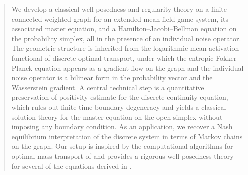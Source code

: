 \documentclass[10pt]{article}
\numberwithin{equation}{section}
\begin{document}
\begin{abstract} We develop a classical well-posedness and regularity theory on a finite connected weighted graph for an extended mean field game system, its associated master equation, and a Hamilton--Jacobi--Bellman equation on the probability simplex, all in the presence of an individual noise operator. The geometric structure is inherited from the logarithmic-mean activation functional of discrete optimal transport, under which the entropic Fokker--Planck equation appears as a gradient flow on the graph and the individual noise operator is a bilinear form in the probability vector and the Wasserstein gradient. A central technical step is a quantitative preservation-of-positivity estimate for the discrete continuity equation, which rules out finite-time boundary degeneracy and yields a classical solution theory for the master equation on the open simplex without imposing any boundary condition. As an application, we recover a Nash equilibrium interpretation of the discrete system in terms of Markov chains on the graph. Our setup is inspired by the computational algorithms for optimal mass transport of \cite{chow2012,li_2017} and provides a rigorous well-posedness theory for several of the equations derived in \cite{GaoLiLiu}.
\end{abstract}



\renewcommand{\thefootnote}{}
\renewcommand{\thefootnote}{\arabic{footnote}}
\end{document}
